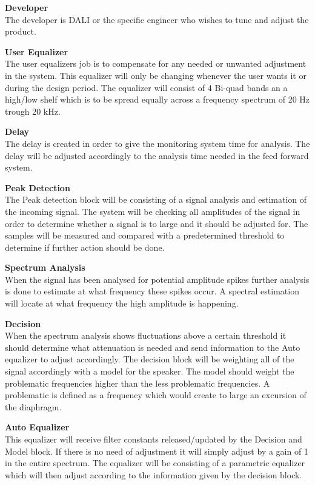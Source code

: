 \textbf{Developer} \\
The developer is DALI or the specific engineer who wishes to tune and adjust the product.

\textbf{User Equalizer} \\
The user equalizers job is to compensate for any needed or unwanted adjustment in the system. This equalizer will only be changing whenever the user wants it or during the design period. The equalizer will consist of 4 Bi-quad bands an a high/low shelf which is to be spread equally across a frequency spectrum of 20 Hz trough 20 kHz.

\textbf{Delay} \\
The delay is created in order to give the monitoring system time for analysis. The delay will be adjusted accordingly to the analysis time needed in the feed forward system.


\textbf{Peak Detection} \\
The Peak detection block will be consisting of a signal analysis and estimation of the incoming signal. The system will be checking all amplitudes of the signal in order to determine whether a signal is to large and it should be adjusted for. The samples will be measured and compared with a predetermined threshold to determine if further action should be done.

\textbf{Spectrum Analysis} \\
When the signal has been analysed for potential amplitude spikes further analysis is done to estimate at what frequency these spikes occur. A spectral estimation will locate at what frequency the high amplitude is happening.  


\textbf{Decision} \\
When the spectrum analysis shows fluctuations above a certain threshold it should determine what attenuation is needed and send information to the Auto equalizer to adjust accordingly. The decision block will be weighting all of the signal accordingly with a model for the speaker. The model should weight the problematic frequencies higher than the less problematic frequencies. A problematic is defined as a frequency which would create to large an excursion of the diaphragm. 



\textbf{Auto Equalizer} \\
This equalizer will receive filter constants released/updated by the Decision and Model block. If there is no need of adjustment it will simply adjust by a gain of 1 in the entire spectrum. The equalizer will be consisting of a parametric equalizer which will then adjust according to the information given by the decision block.


